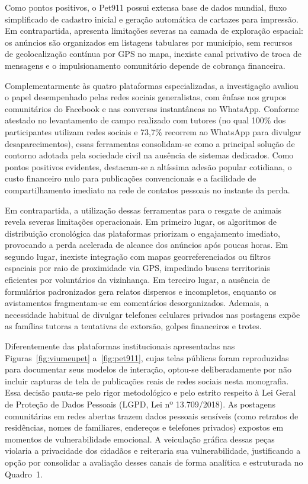 Como pontos positivos, o Pet911 possui extensa base de dados mundial, fluxo simplificado de cadastro inicial e geração automática de cartazes para impressão. Em contrapartida, apresenta limitações severas na camada de exploração espacial: os anúncios são organizados em listagens tabulares por município, sem recursos de geolocalização contínua por GPS no mapa, inexiste canal privativo de troca de mensagens e o impulsionamento comunitário depende de cobrança financeira.

\clearpage

Complementarmente às quatro plataformas especializadas, a investigação avaliou o papel desempenhado pelas redes sociais generalistas, com ênfase nos grupos comunitários do Facebook e nas conversas instantâneas no WhatsApp. Conforme atestado no levantamento de campo realizado com tutores (no qual 100\% dos participantes utilizam redes sociais e 73,7\% recorrem ao WhatsApp para divulgar desaparecimentos), essas ferramentas consolidam-se como a principal solução de contorno adotada pela sociedade civil na ausência de sistemas dedicados. Como pontos positivos evidentes, destacam-se a altíssima adesão popular cotidiana, o custo financeiro nulo para publicações convencionais e a facilidade de compartilhamento imediato na rede de contatos pessoais no instante da perda.

Em contrapartida, a utilização dessas ferramentas para o resgate de animais revela severas limitações operacionais. Em primeiro lugar, os algoritmos de distribuição cronológica das plataformas priorizam o engajamento imediato, provocando a perda acelerada de alcance dos anúncios após poucas horas. Em segundo lugar, inexiste integração com mapas georreferenciados ou filtros espaciais por raio de proximidade via GPS, impedindo buscas territoriais eficientes por voluntários da vizinhança. Em terceiro lugar, a ausência de formulários padronizados gera relatos dispersos e incompletos, enquanto os avistamentos fragmentam-se em comentários desorganizados. Ademais, a necessidade habitual de divulgar telefones celulares privados nas postagens expõe as famílias tutoras a tentativas de extorsão, golpes financeiros e trotes.

Diferentemente das plataformas institucionais apresentadas nas Figuras~\ref{fig:viumeupet} a~\ref{fig:pet911}, cujas telas públicas foram reproduzidas para documentar seus modelos de interação, optou-se deliberadamente por não incluir capturas de tela de publicações reais de redes sociais nesta monografia. Essa decisão pauta-se pelo rigor metodológico e pelo estrito respeito à Lei Geral de Proteção de Dados Pessoais (LGPD, Lei nº 13.709/2018). As postagens comunitárias em redes abertas trazem dados pessoais sensíveis (como retratos de residências, nomes de familiares, endereços e telefones privados) expostos em momentos de vulnerabilidade emocional. A veiculação gráfica dessas peças violaria a privacidade dos cidadãos e reiteraria sua vulnerabilidade, justificando a opção por consolidar a avaliação desses canais de forma analítica e estruturada no Quadro~1.

